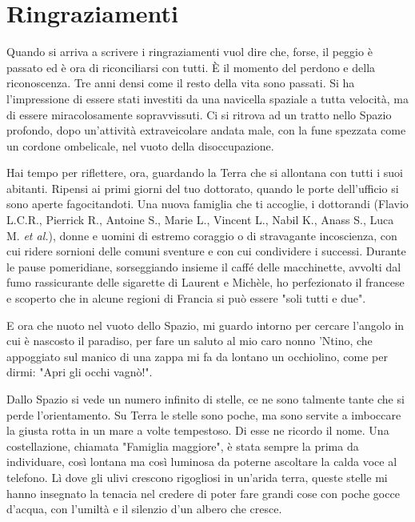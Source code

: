 \chapter*{Ringraziamenti}

Quando si arriva a scrivere i ringraziamenti vuol dire che, forse, il peggio \`e passato ed \`e ora di riconciliarsi con tutti. \`E il momento del perdono e della riconoscenza. Tre anni densi come il resto della vita sono passati. Si ha l'impressione di essere stati investiti da una navicella spaziale a tutta velocit\`a, ma di essere miracolosamente sopravvissuti. Ci si ritrova ad un tratto nello Spazio profondo, dopo un'attivit\`a extraveicolare andata male, con la fune spezzata come un cordone ombelicale, nel vuoto della disoccupazione. 

Hai tempo per riflettere, ora, guardando la Terra che si allontana con tutti i suoi abitanti. Ripensi ai primi giorni del tuo dottorato, quando le porte dell'ufficio si sono aperte fagocitandoti.
Una nuova famiglia che ti accoglie, i dottorandi (Flavio L.C.R., Pierrick R., Antoine S., Marie L., Vincent L., Nabil K., Anass S., Luca M. \textit{et al.}), donne e uomini di estremo coraggio o di stravagante incoscienza, con cui ridere sornioni delle comuni sventure e con cui condividere i successi. Durante le pause pomeridiane, sorseggiando insieme il caff\'e delle macchinette, avvolti dal fumo rassicurante delle sigarette di Laurent e Mich\`ele, ho perfezionato il francese e scoperto che in alcune regioni di Francia si pu\`o essere "soli tutti e due".

E ora che nuoto nel vuoto dello Spazio, mi guardo intorno per cercare l'angolo in cui \`e nascosto il paradiso, per fare un saluto al mio caro nonno 'Ntino, che appoggiato sul manico di una zappa mi fa da lontano un occhiolino, come per dirmi: "Apri gli occhi vagn\`o!". 

Dallo Spazio si vede un numero infinito di stelle, ce ne sono talmente tante che si perde l'orientamento. Su Terra le stelle sono poche, ma sono servite a imboccare la giusta rotta in un mare a volte tempestoso. Di esse ne ricordo il nome. Una costellazione, chiamata "Famiglia maggiore", \`e stata sempre la prima da individuare, cos\`i lontana ma cos\`i luminosa da poterne ascoltare la calda voce al telefono. L\`i dove gli ulivi crescono rigogliosi in un'arida terra, queste stelle mi hanno insegnato la tenacia nel credere di poter fare grandi cose con poche gocce d'acqua, con l'umilt\`a e il silenzio d'un albero che cresce. 

